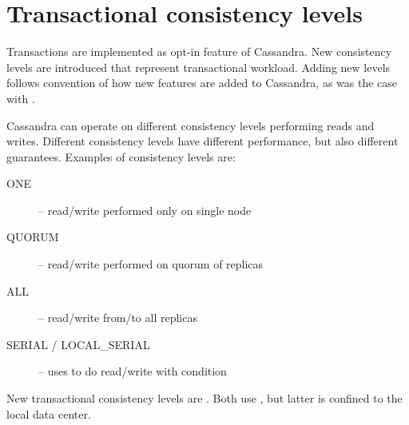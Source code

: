 




\section{Transactional consistency levels}
Transactions are implemented as opt-in feature of Cassandra. New consistency levels  are introduced that represent transactional workload. Adding new levels follows convention of how new features are added to Cassandra, as was the case with \lwt. 
 
Cassandra can operate on different consistency levels performing reads and writes. Different consistency levels have different performance, but also different guarantees. Examples of consistency levels are:
\begin{description}
\item[ONE] -- read/write performed only on single node
\item[QUORUM] -- read/write performed on quorum of replicas
\item[ALL] -- read/write from/to all replicas
\item[SERIAL / LOCAL_SERIAL] -- uses \lwt to do read/write with condition
\end{description}

New transactional consistency levels are . Both use \mpp, but latter is confined to the local data center.

